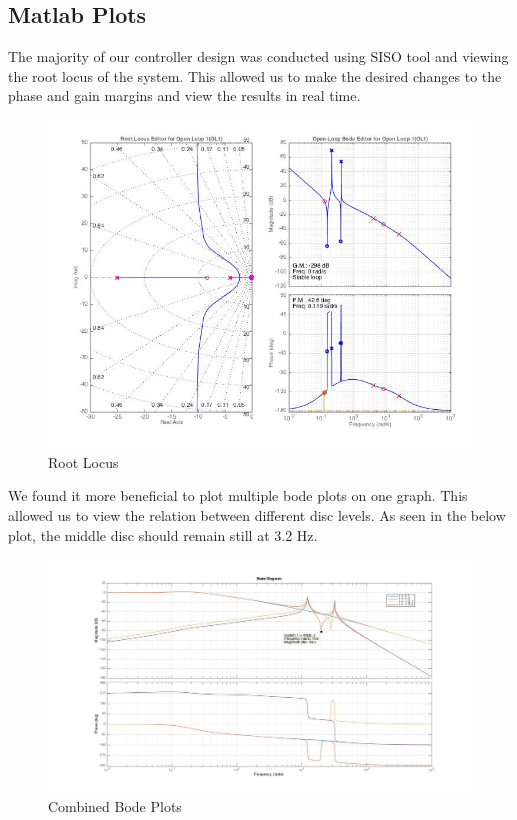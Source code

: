 \documentclass[11pt,titlepage]{article}
\begin{document}
    \subsection{Matlab Plots}
        The majority of our controller design was conducted using SISO tool and viewing the root locus of the system. This allowed us to make the desired changes to the phase and gain margins and view the results in real time.
        \begin{figure}[H]
            \centering
            \includegraphics[scale=0.35]{r_locus}
            \caption{Root Locus}
            \label{fig:rlocus}
        \end{figure}
        We found it more beneficial to plot multiple bode plots on one graph. This allowed us to view the relation between different disc levels. As seen in the below plot, the middle disc should remain still at 3.2 Hz.
        \begin{figure}[H]
            \centering
            \includegraphics[scale=0.35]{bode_all}
            \caption{Combined Bode Plots}
            \label{fig:bode_all}
        \end{figure}
\end{document}
